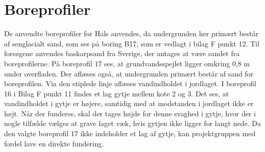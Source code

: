 \section{Boreprofiler} 
De anvendte boreprofiler for Hals anvendes, da undergrunden her primært består af senglacialt sand, som ses på boring B17, som er vedlagt i bilag F punkt 12. Til forsøgene anvendes baskarpsand fra Sverige, der antages at være sandet fra boreprofilerne. 
\newline \indent{     }  På boreprofil 17 ses, at grundvandsspejlet ligger omkring 0,8 m under overfladen. Der aflæses også, at undergrunden primært består af sand for boreprofilen. Via den stiplede linje aflæses vandindholdet i jordlaget. 
\newline \indent{     }  I boreprofil 16 i Bilag F punkt 11 findes et lag gytje mellem kote 2 og 3. Det ses, at vandindholdet i gytje er højere, samtidig med at modstanden i jordlaget ikke er højt. Når der funderes, skal der tages højde for denne svaghed i gytje, hvor der i nogle tilfælde vælges at grave laget væk, hvis gytjen ikke ligger for langt nede. Da den valgte boreprofil 17 ikke indeholder et lag af gytje, kan projektgruppen med fordel lave en direkte fundering.